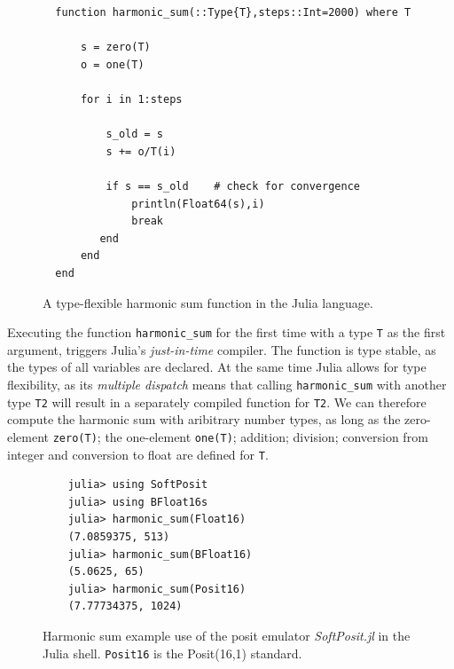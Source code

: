 \documentclass[draft]{agujournal2019}
\begin{document}
\begin{figure}[htbp]
%
%
%
%
\begin{verbatim}
  function harmonic_sum(::Type{T},steps::Int=2000) where T

      s = zero(T)
      o = one(T)

      for i in 1:steps

          s_old = s
          s += o/T(i)

          if s == s_old    # check for convergence
              println(Float64(s),i)
              break
         end
      end
  end
\end{verbatim}
\caption{A type-flexible harmonic sum function in the Julia language.}
\label{fig:harmsum}
\end{figure}

Executing the function \texttt{harmonic\_sum} for the first time with a type \texttt{T} as the first argument, triggers Julia's \emph{just-in-time} compiler. The function is type stable, as the types of all variables are declared. At the same time Julia allows for type flexibility, as its \emph{multiple dispatch} means that calling  \texttt{harmonic\_sum} with another type \texttt{T2} will result in a separately compiled function for \texttt{T2}. We can therefore compute the harmonic sum with aribitrary number types, as long as the zero-element \texttt{zero(T)}; the one-element \texttt{one(T)}; addition; division; conversion from integer and conversion to float are defined for \texttt{T}. 

\begin{figure}[htbp]
\begin{verbatim}
    julia> using SoftPosit
    julia> using BFloat16s
    julia> harmonic_sum(Float16)
    (7.0859375, 513)
    julia> harmonic_sum(BFloat16)
    (5.0625, 65)
    julia> harmonic_sum(Posit16)
    (7.77734375, 1024)
\end{verbatim}
\caption{Harmonic sum example use of the posit emulator \emph{SoftPosit.jl} in the Julia shell. \texttt{Posit16} is the Posit(16,1) standard.}
\label{fig:harmsum2}
\end{figure}
\end{document}
